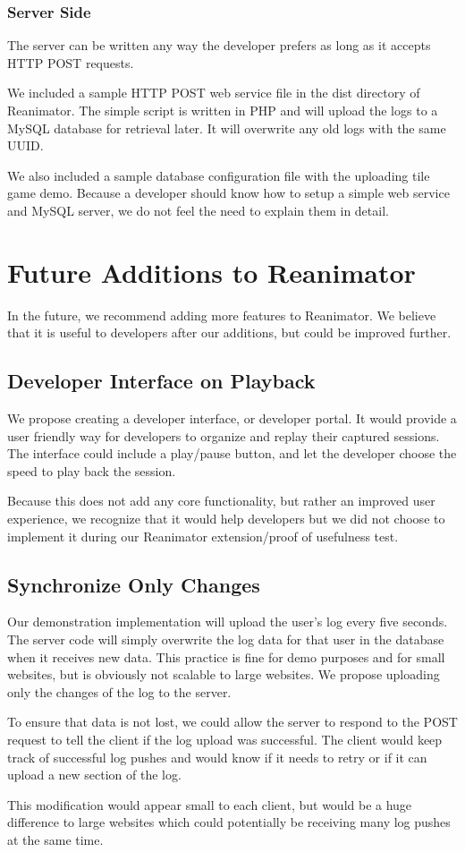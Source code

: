 \documentclass[12pt,journal]{IEEEtran}
\begin{document}
\subsubsection{Server Side}
The server can be written any way the developer prefers as long as it accepts HTTP POST requests.
\par
We included a sample HTTP POST web service file in the dist directory of Reanimator. The simple script is written in PHP and will upload the logs to a MySQL database for retrieval later. It will overwrite any old logs with the same UUID.
\par
We also included a sample database configuration file with the uploading tile game demo. Because a developer should know how to setup a simple web service and MySQL server, we do not feel the need to explain them in detail.

\section{Future Additions to Reanimator}
In the future, we recommend adding more features to Reanimator. We believe that it is useful to developers after our additions, but could be improved further.

\subsection{Developer Interface on Playback}
We propose creating a developer interface, or developer portal. It would provide a user friendly way for developers to organize and replay their captured sessions. The interface could include a play/pause button, and let the developer choose the speed to play back the session.
\par
Because this does not add any core functionality, but rather an improved user experience, we recognize that it would help developers but we did not choose to implement it during our Reanimator extension/proof of usefulness test.

\subsection{Synchronize Only Changes}
Our demonstration implementation will upload the user's log every five seconds. The server code will simply overwrite the log data for that user in the database when it receives new data. This practice is fine for demo purposes and for small websites, but is obviously not scalable to large websites. We propose uploading only the changes of the log to the server.
\par
To ensure that data is not lost, we could allow the server to respond to the POST request to tell the client if the log upload was successful. The client would keep track of successful log pushes and would know if it needs to retry or if it can upload a new section of the log.
\par
This modification would appear small to each client, but would be a huge difference to large websites which could potentially be receiving many log pushes at the same time.
\end{document}
